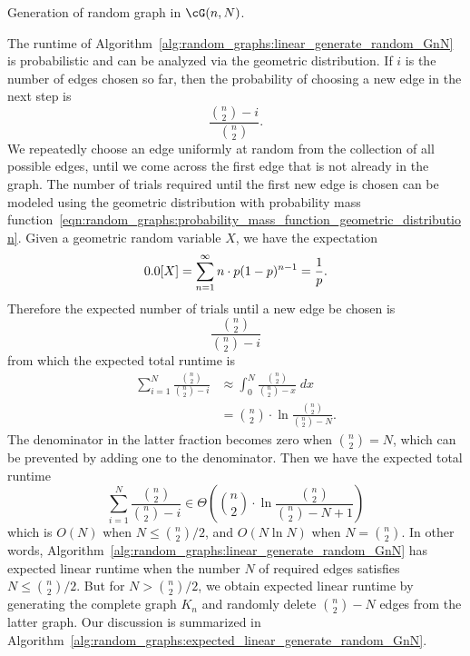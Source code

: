 \begin{algorithm}[!htbp]

\caption{Generation of random graph in $\cG(n,N)$.}
\label{alg:random_graphs:linear_generate_random_GnN}
\end{algorithm}

The runtime of
Algorithm~\ref{alg:random_graphs:linear_generate_random_GnN} is
probabilistic and can be analyzed via the
geometric distribution. If $i$ is the
number of edges chosen so far, then the probability of choosing a new
edge in the next step is
\[
\frac{\binom{n}{2} - i} {\binom{n}{2}}.
\]
We repeatedly choose an edge uniformly at random from the collection
of all possible edges, until we come across the first edge that is not
already in the graph. The number of trials required until the first
new edge is chosen can be modeled using the geometric distribution
with probability mass
function~\eqref{eqn:random_graphs:probability_mass_function_geometric_distribution}.
Given a geometric random variable $X$, we have the expectation
\[
\E[X]
=
\sum_{n=1}^\infty n \cdot p(1 - p)^{n-1}
=
\frac{1}{p}.
\]
Therefore the expected number of trials until a new edge be chosen is
\[
\frac{\binom{n}{2}} {\binom{n}{2} - i}
\]
from which the expected total runtime is
\begin{align*}
\label{eqn:random_graphs:Erdos_Renyi_expected_total_runtime_sum}
\sum_{i=1}^N \frac{\binom{n}{2}} {\binom{n}{2} - i}
&\approx
\int_0^N \frac{\binom{n}{2}} {\binom{n}{2} - x} \; dx \\[4pt]
&=
\binom{n}{2} \cdot \ln \frac{\binom{n}{2}} {\binom{n}{2} - N}.
\end{align*}
The denominator in the latter fraction becomes zero when
$\binom{n}{2} = N$, which can be prevented by adding one to the
denominator. Then we have the expected total runtime
\[
\sum_{i=1}^N \frac{\binom{n}{2}} {\binom{n}{2} - i}
\in
\Theta
\left(
  \binom{n}{2} \cdot \ln \frac{\binom{n}{2}} {\binom{n}{2} - N + 1}
\right)
\]
which is $O(N)$ when $N \leq \binom{n}{2} / 2$, and $O(N \ln N)$ when
$N = \binom{n}{2}$. In other words,
Algorithm~\ref{alg:random_graphs:linear_generate_random_GnN} has
expected linear runtime when the number $N$ of required edges
satisfies $N \leq \binom{n}{2} / 2$. But for $N > \binom{n}{2} / 2$,
we obtain expected linear runtime by generating the
complete graph $K_n$ and randomly delete
$\binom{n}{2} - N$ edges from the latter graph. Our discussion is
summarized in
Algorithm~\ref{alg:random_graphs:expected_linear_generate_random_GnN}.

